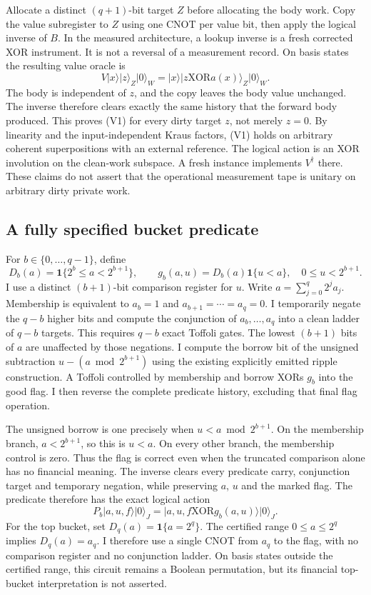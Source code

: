 Allocate a distinct \((q+1)\)-bit target \(Z\) before allocating the body
work. Copy the value subregister to \(Z\) using one CNOT per value bit, then
apply the logical inverse of \(B\). In the measured architecture, a lookup
inverse is a fresh corrected XOR instrument. It is not a reversal of a
measurement record. On basis states the resulting value oracle is
\[
 V\lvert x\rangle\lvert z\rangle_Z\lvert0\rangle_W
 =\lvert x\rangle\lvert z\mathbin{\mathrm{XOR}}a(x)\rangle_Z
   \lvert0\rangle_W.                                      \tag{V1}
\]
The body is independent of \(z\), and the copy leaves the body value
unchanged. The inverse therefore clears exactly the same history that the
forward body produced. This proves (V1) for every dirty target \(z\), not
merely \(z=0\). By linearity and the input-independent Kraus factors,
(V1) holds on arbitrary coherent superpositions with an external reference.
The logical action is an XOR involution on the clean-work subspace. A fresh
instance implements \(V^\dagger\) there. These claims do not assert that
the operational measurement tape is unitary on arbitrary dirty private work.

\subsection{A fully specified bucket predicate}

For \(b\in\{0,\ldots,q-1\}\), define
\[
 D_b(a)=\boldsymbol1\{2^b\leq a<2^{b+1}\},\qquad
 g_b(a,u)=D_b(a)\boldsymbol1\{u<a\},
 \quad 0\leq u<2^{b+1}.
\]
I use a distinct \((b+1)\)-bit comparison register for \(u\). Write
\(a=\sum_{j=0}^q2^j a_j\). Membership is equivalent to
\(a_b=1\) and \(a_{b+1}=\cdots=a_q=0\). I temporarily negate the
\(q-b\) higher bits and compute the conjunction of
\(a_b,\ldots,a_q\) into a clean ladder of \(q-b\) targets.
This requires \(q-b\) exact Toffoli gates. The lowest \((b+1)\)
bits of \(a\) are unaffected by those negations. I compute the borrow bit
of the unsigned subtraction
\(u-(a\bmod2^{b+1})\) using the existing explicitly emitted ripple
construction. A Toffoli controlled by membership and borrow XORs
\(g_b\) into the good flag. I then reverse the complete predicate history,
excluding that final flag operation.

The unsigned borrow is one precisely when
\(u<a\bmod2^{b+1}\). On the membership branch, \(a<2^{b+1}\),
so this is \(u<a\). On every other branch, the membership control is
zero. Thus the flag is correct even when the truncated comparison alone
has no financial meaning. The inverse clears every predicate carry,
conjunction target and temporary negation, while preserving \(a\), \(u\)
and the marked flag. The predicate therefore has the exact logical action
\[
 P_b\lvert a,u,f\rangle\lvert0\rangle_J
 =\lvert a,u,f\mathbin{\mathrm{XOR}}g_b(a,u)\rangle
   \lvert0\rangle_J.                                      \tag{V2}
\]
For the top bucket, set \(D_q(a)=\boldsymbol1\{a=2^q\}\).
The certified range \(0\leq a\leq2^q\) implies \(D_q(a)=a_q\).
I therefore use a single CNOT from \(a_q\) to the flag, with no comparison
register and no conjunction ladder. On basis states outside the certified
range, this circuit remains a Boolean permutation, but its financial
top-bucket interpretation is not asserted.

